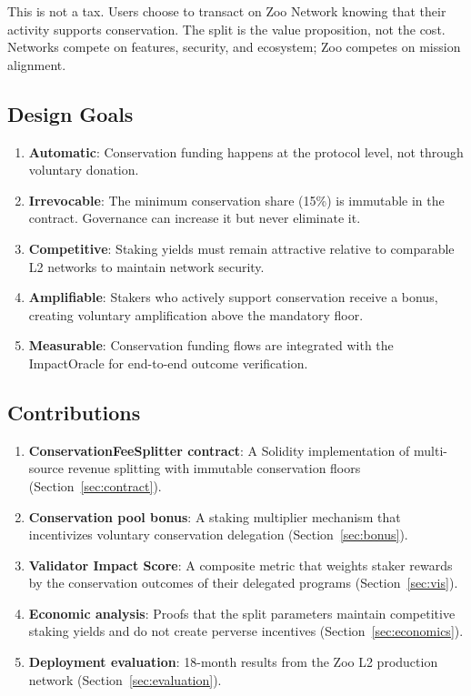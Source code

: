 \documentclass[11pt,letterpaper]{article}
\begin{document}
This is not a tax. Users choose to transact on Zoo Network knowing that their activity supports conservation. The split is the value proposition, not the cost. Networks compete on features, security, and ecosystem; Zoo competes on mission alignment.

\subsection{Design Goals}

\begin{enumerate}
    \item \textbf{Automatic}: Conservation funding happens at the protocol level, not through voluntary donation.
    \item \textbf{Irrevocable}: The minimum conservation share (15\%) is immutable in the contract. Governance can increase it but never eliminate it.
    \item \textbf{Competitive}: Staking yields must remain attractive relative to comparable L2 networks to maintain network security.
    \item \textbf{Amplifiable}: Stakers who actively support conservation receive a bonus, creating voluntary amplification above the mandatory floor.
    \item \textbf{Measurable}: Conservation funding flows are integrated with the ImpactOracle for end-to-end outcome verification.
\end{enumerate}

\subsection{Contributions}

\begin{enumerate}
    \item \textbf{ConservationFeeSplitter contract}: A Solidity implementation of multi-source revenue splitting with immutable conservation floors (Section~\ref{sec:contract}).
    \item \textbf{Conservation pool bonus}: A staking multiplier mechanism that incentivizes voluntary conservation delegation (Section~\ref{sec:bonus}).
    \item \textbf{Validator Impact Score}: A composite metric that weights staker rewards by the conservation outcomes of their delegated programs (Section~\ref{sec:vis}).
    \item \textbf{Economic analysis}: Proofs that the split parameters maintain competitive staking yields and do not create perverse incentives (Section~\ref{sec:economics}).
    \item \textbf{Deployment evaluation}: 18-month results from the Zoo L2 production network (Section~\ref{sec:evaluation}).
\end{enumerate}
\end{document}
